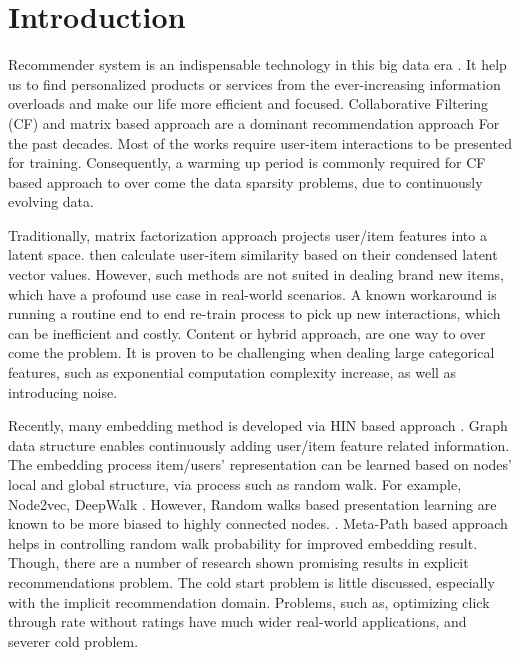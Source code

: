 \section{Introduction}

Recommender system is an indispensable technology in this big data era \cite{lu2015recommender}. It help us to find personalized products or services from the ever-increasing information overloads and make our life more efficient and focused. Collaborative Filtering (CF) and matrix based approach are a dominant recommendation approach For the past decades. Most of the works require user-item interactions to be presented for training. Consequently, a warming up period is commonly required for CF based approach to over come the data sparsity problems, due to continuously evolving data.

Traditionally, matrix factorization approach projects user/item features into a latent space. then calculate user-item similarity based on their condensed latent vector values. However, such methods are not suited in dealing brand new items, which have a profound use case in real-world scenarios. A known workaround is running a routine end to end re-train process to pick up new interactions, which can be inefficient and costly. Content or hybrid approach, are one way to over come the problem. It is proven to be challenging when dealing large categorical features, such as exponential computation complexity increase, as well as introducing noise.

Recently, many embedding method is developed via HIN based approach \cite{mao2016multirelational,wang2016member}. Graph data structure enables continuously adding user/item feature related information. The embedding process item/users' representation can be learned based on nodes' local and global structure, via process such as random walk. For example, Node2vec, DeepWalk \cite{grover2016node2vec} \cite{perozzi2014deepwalk}. However, Random walks based presentation learning are known to be more biased to highly connected nodes. \cite{sun2011pathsim}. Meta-Path based approach \cite{dong2017metapath2vec} helps in controlling random walk probability for improved embedding result. Though, there are a number of research shown promising results in explicit recommendations problem. The cold start problem is little discussed, especially with the implicit recommendation domain. Problems, such as, optimizing click through rate without ratings have much wider real-world applications, and severer cold problem. 

